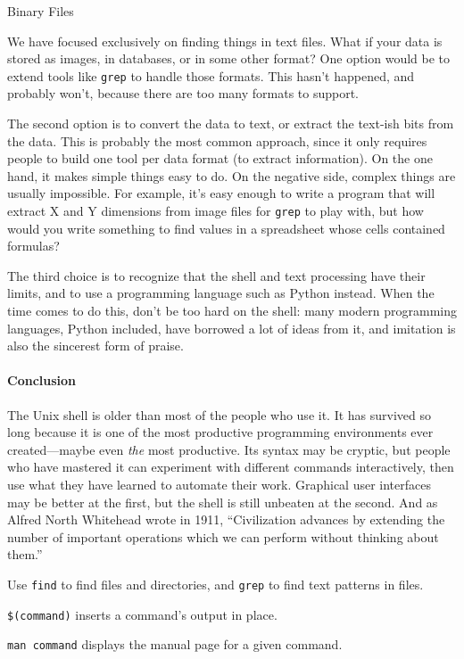 \documentclass{book}
\begin{document}
\begin{swcbox}{Binary Files}

We have focused exclusively on finding things in text files. What if
your data is stored as images, in databases, or in some other format?
One option would be to extend tools like \texttt{grep} to handle those
formats. This hasn't happened, and probably won't, because there are too
many formats to support.

The second option is to convert the data to text, or extract the
text-ish bits from the data. This is probably the most common approach,
since it only requires people to build one tool per data format (to
extract information). On the one hand, it makes simple things easy to
do. On the negative side, complex things are usually impossible. For
example, it's easy enough to write a program that will extract X and Y
dimensions from image files for \texttt{grep} to play with, but how
would you write something to find values in a spreadsheet whose cells
contained formulas?

The third choice is to recognize that the shell and text processing have
their limits, and to use a programming language such as Python instead.
When the time comes to do this, don't be too hard on the shell: many
modern programming languages, Python included, have borrowed a lot of
ideas from it, and imitation is also the sincerest form of praise.

\end{swcbox}

\mbox{}\paragraph{Conclusion}

The Unix shell is older than most of the people who use it. It has
survived so long because it is one of the most productive programming
environments ever created---maybe even \emph{the} most productive. Its
syntax may be cryptic, but people who have mastered it can experiment
with different commands interactively, then use what they have learned
to automate their work. Graphical user interfaces may be better at the
first, but the shell is still unbeaten at the second. And as Alfred
North Whitehead wrote in 1911, ``Civilization advances by extending the
number of important operations which we can perform without thinking
about them.''

\begin{keypoints}
\begin{swcitemize}
\item
  Use \texttt{find} to find files and directories, and \texttt{grep} to
  find text patterns in files.
\item
  \texttt{\$(command)} inserts a command's output in place.
\item
  \texttt{man command} displays the manual page for a given command.
\end{swcitemize}
\end{keypoints}
\end{document}
